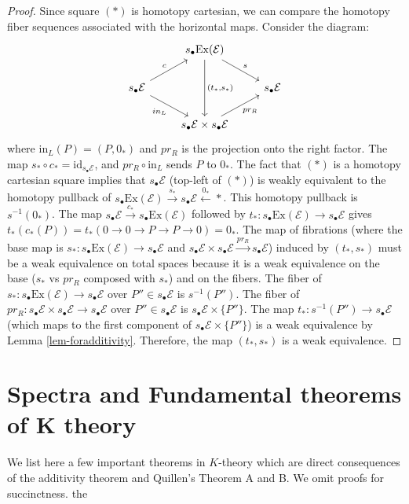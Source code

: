 \documentclass[12pt]{report}
\numberwithin{equation}{section}
\begin{document}
\begin{proof}
	Since square $(*)$ is homotopy cartesian, we can compare the homotopy fiber sequences associated with the horizontal maps.
	Consider the diagram:
\[\begin{tikzcd}
	& {s_\bullet \mathrm{Ex}(\mathcal{E})} \\
	{s_\bullet \mathcal{E}} && {s_\bullet \mathcal{E}} \\
	& {s_\bullet \mathcal E \times s_\bullet \mathcal E}
	\arrow["s", from=1-2, to=2-3]
	\arrow["{(t_*,s_*)}", from=1-2, to=3-2]
	\arrow["c", from=2-1, to=1-2]
	\arrow["{in_L}"', from=2-1, to=3-2]
	\arrow["{pr_R}"', from=3-2, to=2-3]
\end{tikzcd}\]
	where $\mathrm{in}_L(P) = (P, 0_*)$ and $pr_R$ is the projection onto the right factor.
	The map $s_* \circ c_* = \mathrm{id}_{s_{\bullet}\mathcal{E}}$, and $pr_R \circ \mathrm{in}_L$ sends $P$ to $0_*$.
	The fact that $(*)$ is a homotopy cartesian square implies that $s_{\bullet}\mathcal{E}$ (top-left of $(*)$) is weakly equivalent to the homotopy pullback of $s_{\bullet}\mathrm{Ex}(\mathcal{E}) \xrightarrow{s_*} s_{\bullet}\mathcal{E} \xleftarrow{0_*} \ast$. This homotopy pullback is $s^{-1}(0_*)$.
	The map $s_{\bullet}\mathcal{E} \xrightarrow{c_*} s_{\bullet}\mathrm{Ex}(\mathcal{E})$ followed by $t_*: s_{\bullet}\mathrm{Ex}(\mathcal{E}) \to s_{\bullet}\mathcal{E}$ gives $t_*(c_*(P)) = t_*(0 \to 0 \to P \to P \to 0) = 0_*$.
	The map of fibrations (where the base map is $s_*: s_{\bullet}\mathrm{Ex}(\mathcal{E}) \to s_{\bullet}\mathcal{E}$ and $s_{\bullet}\mathcal{E} \times s_{\bullet}\mathcal{E} \xrightarrow{pr_R} s_{\bullet}\mathcal{E}$) induced by $(t_*, s_*)$ must be a weak equivalence on total spaces because it is a weak equivalence on the base ($s_*$ vs $pr_R$ composed with $s_*$) and on the fibers.
	The fiber of $s_*: s_{\bullet}\mathrm{Ex}(\mathcal{E}) \to s_{\bullet}\mathcal{E}$ over $P'' \in s_{\bullet}\mathcal{E}$ is $s^{-1}(P'')$.
	The fiber of $pr_R: s_{\bullet}\mathcal{E} \times s_{\bullet}\mathcal{E} \to s_{\bullet}\mathcal{E}$ over $P'' \in s_{\bullet}\mathcal{E}$ is $s_{\bullet}\mathcal{E} \times \{P''\}$.
	The map $t_*: s^{-1}(P'') \to s_{\bullet}\mathcal{E}$ (which maps to the first component of $s_{\bullet}\mathcal{E} \times \{P''\}$) is a weak equivalence by Lemma \ref{lem-foradditivity}.
	Therefore, the map $(t_*,s_*)$ is a weak equivalence.
\end{proof}
	
	
	\section{Spectra and Fundamental theorems of K theory}
	We list here a few important theorems in \( K \)-theory which are direct consequences of the additivity theorem and Quillen's Theorem A and B. We omit proofs for succinctness. the
	
\end{document}
